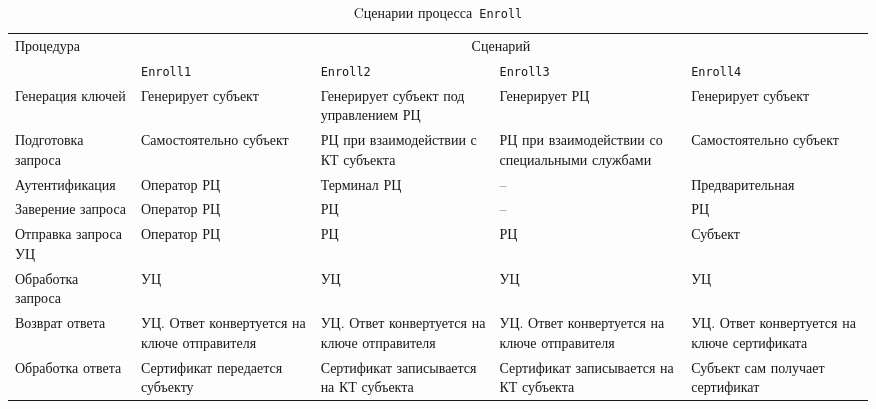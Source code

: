 
\begin{table}[bht]
\caption{Cценарии процесса~\texttt{Enroll}} 
\label{Table.ENROLL.Summary}
\begin{tabular}{|p{3cm}|p{3cm}|p{3cm}|p{3cm}|p{3cm}|}
\hline
Процедура & \multicolumn{4}{|c|}{Сценарий}\\
\cline{2-5}
&\texttt{Enroll1}&\texttt{Enroll2}&\texttt{Enroll3}&\texttt{Enroll4}\\
\hline
\hline
Генерация ключей & 
Генерирует субъект & 
Генерирует субъект под управлением РЦ &
Генерирует РЦ &
Генерирует субъект\\
\hline
%
Подготовка запроса & 
Самостоятельно субъект & 
РЦ при взаимодействии с КТ субъекта &
РЦ при взаимодействии со специальными службами &
Самостоятельно субъект\\
\hline
%
Аутентификация & 
Оператор РЦ &
Терминал РЦ & 
-- & 
Предварительная\\
\hline
%
Заверение запроса & 
Оператор РЦ &
РЦ & 
-- & 
РЦ\\
\hline
%
Отправка запроса УЦ & 
Оператор РЦ &
РЦ & 
РЦ & 
Субъект\\
\hline
%
Обработка запроса & 
УЦ &
УЦ & 
УЦ & 
УЦ\\
\hline
%
Возврат ответа & 
УЦ. Ответ конвертуется на ключе отправителя &
УЦ. Ответ конвертуется на ключе отправителя &
УЦ. Ответ конвертуется на ключе отправителя &
УЦ. Ответ конвертуется на ключе сертификата\\
\hline
%
Обработка ответа & 
Сертификат передается субъекту &
Сертификат записывается на КТ субъекта &
Сертификат записывается на КТ субъекта &
Субъект сам получает сертификат\\
\hline
\end{tabular}
\end{table}
